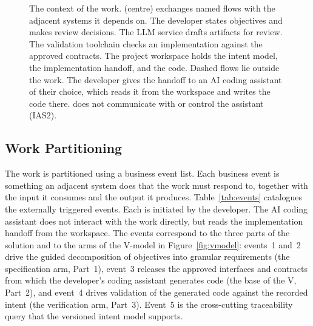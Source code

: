 \documentclass[12pt]{article}
\begin{document}
\begin{figure}[H]
{}
\caption{The context of the work. \progname{} (centre) exchanges named flows with
the adjacent systems it depends on. The developer states objectives and makes
review decisions. The LLM service drafts artifacts for review. The validation
toolchain checks an implementation against the approved contracts. The project
workspace holds the intent model, the implementation handoff, and the code.
Dashed flows lie outside the work. The developer gives the handoff to an AI
coding assistant of their choice, which reads it from the workspace and writes
the code there. \progname{} does not
communicate with or control the assistant (IAS2).}
\label{fig:context}
\end{figure}


\subsection{Work Partitioning}

The work is partitioned using a business event list. Each business event is
something an adjacent system does that the work must respond to, together with
the input it consumes and the output it produces. Table~\ref{tab:events}
catalogues the externally triggered events. Each is initiated by the developer.
The AI coding assistant does not interact with the work directly, but reads the
implementation handoff from the workspace. The events correspond to the three parts of the
solution and to the arms of the V-model in Figure~\ref{fig:vmodel}: events~1
and~2 drive the guided decomposition of objectives into granular requirements
(the specification arm, Part~1), event~3 releases the approved interfaces and contracts from which the
developer's coding assistant generates code (the base of the V, Part~2), and event~4 drives validation of the generated code
against the recorded intent (the verification arm, Part~3). Event~5 is the
cross-cutting traceability query that the versioned intent model supports.
\end{document}
